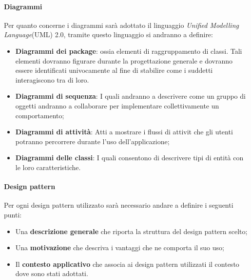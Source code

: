 \paragraph{Diagrammi}
Per quanto concerne i diagrammi sarà adottato il linguaggio \textit{Unified Modelling Language}(UML) 2.0,
tramite questo linguaggio si andranno a definire:
\begin{itemize}
\item \textbf{Diagrammi dei package}: ossia elementi di raggruppamento di classi. Tali elementi dovranno figurare durante la progettazione generale e dovranno essere identificati univocamente al fine di stabilire come i suddetti interagiscono tra di loro.

\item \textbf{Diagrammi di sequenza}: I quali andranno a descrivere come un gruppo di oggetti andranno a collaborare per implementare collettivamente un comportamento;

\item \textbf{Diagrammi di attività}: Atti a mostrare i flussi di attivit che gli utenti potranno percorrere durante l'uso dell'applicazione;

\item \textbf{Diagrammi delle classi}: I quali consentono di descrivere tipi di entità con le loro caratteristiche.
\end{itemize}

\paragraph{Design pattern}
Per ogni design pattern utilizzato sarà necessario andare a definire i seguenti punti:
\begin{itemize}
\item Una \textbf{descrizione generale} che riporta la struttura del design pattern scelto;
\item Una \textbf{motivazione} che descriva i vantaggi che ne comporta il suo uso;
\item Il \textbf{contesto applicativo} che associa ai design pattern utilizzati il contesto dove sono stati adottati.
\end{itemize}

